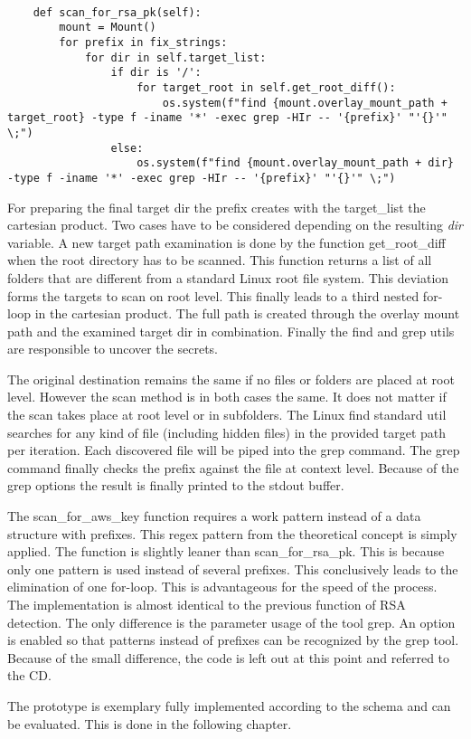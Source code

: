 \lstset{language=Python}          
\begin{lstlisting}[]  % Start your code-block
		
    def scan_for_rsa_pk(self):
        mount = Mount()
        for prefix in fix_strings:
            for dir in self.target_list:
                if dir is '/':
                    for target_root in self.get_root_diff():
                        os.system(f"find {mount.overlay_mount_path + target_root} -type f -iname '*' -exec grep -HIr -- '{prefix}' "'{}'" \;")
                else:
                    os.system(f"find {mount.overlay_mount_path + dir} -type f -iname '*' -exec grep -HIr -- '{prefix}' "'{}'" \;")
\end{lstlisting}
For preparing the final target dir the prefix creates with the target\_list the cartesian product. 
Two cases have to be considered depending on the resulting \textit{dir} variable. 
A new target path examination is done by the function get\_root\_diff when the root directory has to be scanned. 
This function returns a list of all folders that are different from a standard Linux root file system. 
This deviation forms the targets to scan on root level. This finally leads to a third nested for-loop in the cartesian product. 
The full path is created through the overlay mount path and the examined target dir in combination. 
Finally the find and grep utils are responsible to uncover the secrets.

The original destination remains the same if no files or folders are placed at root level.
However the scan method is in both cases the same. It does not matter if the scan takes place at root level or in subfolders.
The Linux find standard util searches for any kind of file (including hidden files) in the provided target path per iteration.
Each discovered file will be piped into the grep command. The grep command finally checks the prefix against the file at context level. 
Because of the grep options the result is finally printed to the stdout buffer.

The scan\_for\_aws\_key function requires a work pattern instead of a data structure with prefixes. 
This regex pattern from the theoretical concept is simply applied.
The function is slightly leaner than scan\_for\_rsa\_pk. 
This is because only one pattern is used instead of several prefixes. 
This conclusively leads to the elimination of one for-loop.
This is advantageous for the speed of the process. 
The implementation is almost identical to the previous function of RSA detection. 
The only difference is the parameter usage of the tool grep. 
An option is enabled so that patterns instead of prefixes can be recognized by the grep tool.
Because of the small difference, the code is left out at this point and referred to the CD.

The prototype is exemplary fully implemented according to the schema and can be evaluated. This is done in the following chapter.